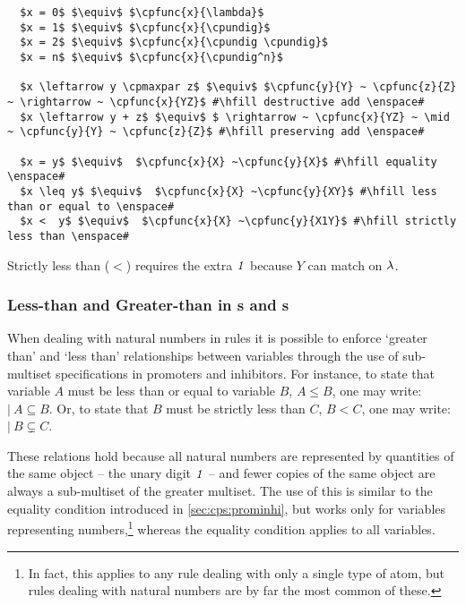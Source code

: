 \lstset{xleftmargin=.5in, xrightmargin=.5in} 
\begin{lstlisting}
  $x = 0$ $\equiv$ $\cpfunc{x}{\lambda}$
  $x = 1$ $\equiv$ $\cpfunc{x}{\cpundig}$
  $x = 2$ $\equiv$ $\cpfunc{x}{\cpundig \cpundig}$
  $x = n$ $\equiv$ $\cpfunc{x}{\cpundig^n}$
  
  $x \leftarrow y \cpmaxpar z$ $\equiv$ $\cpfunc{y}{Y} ~ \cpfunc{z}{Z} ~ \rightarrow ~ \cpfunc{x}{YZ}$ #\hfill destructive add \enspace#
  $x \leftarrow y + z$ $\equiv$ $ \rightarrow ~ \cpfunc{x}{YZ} ~ \mid ~ \cpfunc{y}{Y} ~ \cpfunc{z}{Z}$ #\hfill preserving add \enspace#
  
  $x = y$ $\equiv$  $\cpfunc{x}{X} ~\cpfunc{y}{X}$ #\hfill equality \enspace#
  $x \leq y$ $\equiv$  $\cpfunc{x}{X} ~\cpfunc{y}{XY}$ #\hfill less than or equal to \enspace#
  $x <  y$ $\equiv$  $\cpfunc{x}{X} ~\cpfunc{y}{X1Y}$ #\hfill strictly less than \enspace#
\end{lstlisting}
\noindent
 Strictly less than  (\(<\)) requires the extra \(\mathit{1}\) because \(Y\) can match on \(\lambda\).

\subsubsection{Less-than and Greater-than in s and s}

When dealing with natural numbers in rules it is possible to enforce `greater than' and `less than' relationships between variables through the use of sub-multiset specifications in \glspl{promoter} and \glspl{inhibitor}.  For instance, to state that variable \(A\) must be less than or equal to variable \(B\), \ie{} \(A \leq B\), one may write: \(|~ A \subseteq B\).  Or, to state that \(B\) must be strictly less than \(C\), \ie{} \(B < C\), one may write: \(|~ B \subsetneq C\).

These relations hold because all natural numbers are represented by quantities of the same object -- the unary digit \(\mathit{1}\) -- and fewer copies of the same object are always a sub-multiset of the greater multiset.  The use of this is similar to the equality condition introduced in \cref{sec:cps:prominhi}, but works only for variables representing numbers,\footnote{In fact, this applies to any rule dealing with only a single type of atom, but rules dealing with natural numbers are by far the most common of these.} whereas the equality condition applies to all variables. 

